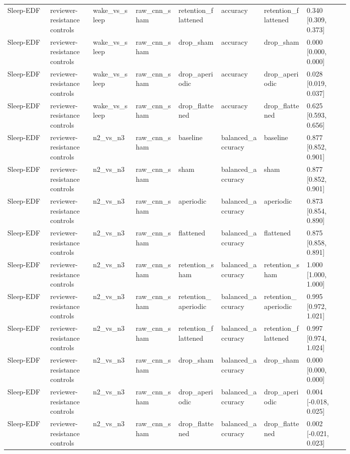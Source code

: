 \begin{longtable}{p{0.10\linewidth}p{0.10\linewidth}p{0.10\linewidth}p{0.10\linewidth}p{0.10\linewidth}p{0.10\linewidth}p{0.10\linewidth}p{0.10\linewidth}}
Sleep-EDF & reviewer-resistance controls & wake\_vs\_sleep & raw\_cnn\_sham & retention\_flattened & accuracy & retention\_flattened & 0.340 [0.309, 0.373]\\
Sleep-EDF & reviewer-resistance controls & wake\_vs\_sleep & raw\_cnn\_sham & drop\_sham & accuracy & drop\_sham & 0.000 [0.000, 0.000]\\
Sleep-EDF & reviewer-resistance controls & wake\_vs\_sleep & raw\_cnn\_sham & drop\_aperiodic & accuracy & drop\_aperiodic & 0.028 [0.019, 0.037]\\
Sleep-EDF & reviewer-resistance controls & wake\_vs\_sleep & raw\_cnn\_sham & drop\_flattened & accuracy & drop\_flattened & 0.625 [0.593, 0.656]\\
Sleep-EDF & reviewer-resistance controls & n2\_vs\_n3 & raw\_cnn\_sham & baseline & balanced\_accuracy & baseline & 0.877 [0.852, 0.901]\\
Sleep-EDF & reviewer-resistance controls & n2\_vs\_n3 & raw\_cnn\_sham & sham & balanced\_accuracy & sham & 0.877 [0.852, 0.901]\\
Sleep-EDF & reviewer-resistance controls & n2\_vs\_n3 & raw\_cnn\_sham & aperiodic & balanced\_accuracy & aperiodic & 0.873 [0.854, 0.890]\\
Sleep-EDF & reviewer-resistance controls & n2\_vs\_n3 & raw\_cnn\_sham & flattened & balanced\_accuracy & flattened & 0.875 [0.858, 0.891]\\
Sleep-EDF & reviewer-resistance controls & n2\_vs\_n3 & raw\_cnn\_sham & retention\_sham & balanced\_accuracy & retention\_sham & 1.000 [1.000, 1.000]\\
Sleep-EDF & reviewer-resistance controls & n2\_vs\_n3 & raw\_cnn\_sham & retention\_aperiodic & balanced\_accuracy & retention\_aperiodic & 0.995 [0.972, 1.021]\\
Sleep-EDF & reviewer-resistance controls & n2\_vs\_n3 & raw\_cnn\_sham & retention\_flattened & balanced\_accuracy & retention\_flattened & 0.997 [0.974, 1.024]\\
Sleep-EDF & reviewer-resistance controls & n2\_vs\_n3 & raw\_cnn\_sham & drop\_sham & balanced\_accuracy & drop\_sham & 0.000 [0.000, 0.000]\\
Sleep-EDF & reviewer-resistance controls & n2\_vs\_n3 & raw\_cnn\_sham & drop\_aperiodic & balanced\_accuracy & drop\_aperiodic & 0.004 [-0.018, 0.025]\\
Sleep-EDF & reviewer-resistance controls & n2\_vs\_n3 & raw\_cnn\_sham & drop\_flattened & balanced\_accuracy & drop\_flattened & 0.002 [-0.021, 0.023]\\

\end{longtable}

